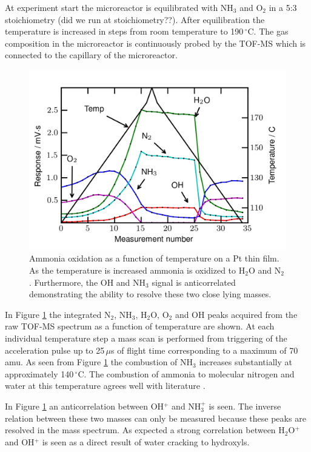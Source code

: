 \documentclass[aip,rsi]{revtex4-1}
\begin{document}
At experiment start the microreactor is equilibrated with NH$_3$ and O$_2$ in a 5:3 stoichiometry (did we run at stoichiometry??). After equilibration the temperature is increased in steps from room temperature to 190\,$^{\circ}$C. The gas composition in the microreactor is continuously probed by the TOF-MS which is connected to the capillary of the microreactor.
\begin{figure}
 \includegraphics[width=14cm]{ammonia_reactivity.png}%
 \caption{Ammonia oxidation as a function of temperature on a Pt thin film. As the temperature is increased ammonia is oxidized to H$_2$O and N$_2$. Furthermore, the OH and NH$_3$ signal is anticorrelated demonstrating the ability to resolve these two close lying masses.\label{fig:ammonia_reactivity}}%
\end{figure}
In Figure \ref{fig:ammonia_reactivity} the integrated N$_2$, NH$_3$, H$_2$O, O$_2$ and OH peaks acquired from the raw TOF-MS spectrum as a function of temperature are shown. At each individual temperature step a mass scan is performed from triggering of the acceleration pulse up to 25\,$\mu$s of flight time corresponding to a maximum of 70 amu. As seen from Figure \ref{fig:ammonia_reactivity} the combustion of NH$_3$ increases substantially at approximately 140\,$^{\circ}$C. The combustion of ammonia to molecular nitrogen and water at this temperature agrees well with literature \cite{Imbihl2007,Zeng2009}. 

In Figure \ref{fig:ammonia_reactivity} an anticorrelation between OH$^{+}$ and NH$_3^+$ is seen. The inverse relation between these two masses can only be measured because these peaks are resolved in the mass spectrum. As expected a strong correlation between H$_2$O$^{+}$ and OH$^+$ is seen as a direct result of water cracking to hydroxyls.
\end{document}
